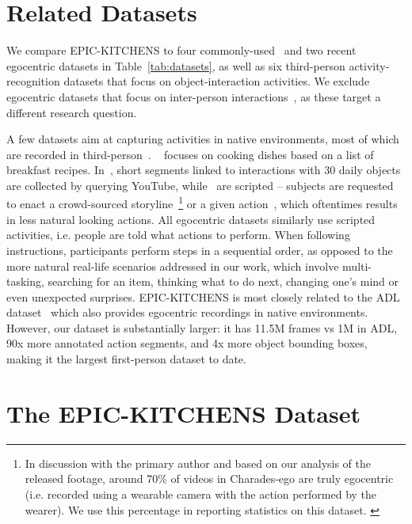 \documentclass[runningheads]{llncs}
\newcommand{\EPIC}{\textcolor{EPIC-COLOR}{{EPIC-KITCHENS}}}
\begin{document}
\section{Related Datasets}
We compare \EPIC{} to four commonly-used~\cite{Damen2014a,Fathi2012,Pirsiavash2012,de2008guide} and two recent~\cite{EGTEA,sigurdsson2018charadesego} egocentric datasets in Table~\ref{tab:datasets}, as well as six 
third-person activity-recognition datasets \cite{fouhey2017lifestyle,Sigurdsson2016,Zhou2017,Kuehne2014,Stein2013,Rohrbach2012} that focus on object-interaction activities. 
We exclude  egocentric datasets that focus on inter-person interactions~\cite{Alletto2015,Fathi2012b,Ryoo2013}, as these target a different research question. 

A few datasets aim at capturing activities in native environments, most of which are recorded in third-person~\cite{Goyal2017,fouhey2017lifestyle,Sigurdsson2016,sigurdsson2018charadesego,Kuehne2014}. ~\cite{Kuehne2014} focuses on cooking dishes based on a list of breakfast recipes. In~\cite{fouhey2017lifestyle}, short segments linked to interactions with 30 daily objects are collected by querying YouTube, while~\cite{Goyal2017,Sigurdsson2016,sigurdsson2018charadesego} are scripted -- subjects are requested to enact a crowd-sourced storyline~\cite{Sigurdsson2016,sigurdsson2018charadesego}\footnote{\tiny{In discussion with the primary author and based on our analysis of the released footage, around 70\% of videos in Charades-ego are truly egocentric (i.e. recorded using a wearable camera with the action performed by the wearer). We use this percentage in reporting statistics on this dataset. }} or a given action~\cite{Goyal2017}, which oftentimes results in less natural looking actions.
All egocentric datasets similarly use scripted activities, i.e. people are told what actions to perform. When following  instructions, participants perform steps in a sequential order, as opposed to the more natural real-life scenarios addressed in our work, which involve multi-tasking, searching for an item, thinking what to do next, changing one's mind or even unexpected surprises. \EPIC{} is most closely related to the ADL dataset~\cite{Pirsiavash2012} which also provides egocentric recordings in native environments. However, our dataset is substantially larger: it has 11.5M frames vs 1M in ADL, 90x more annotated action segments, and 4x more object bounding boxes, making it the largest first-person dataset to date. 

\section{The \EPIC{} Dataset}
\label{sec:dataset}
\end{document}
